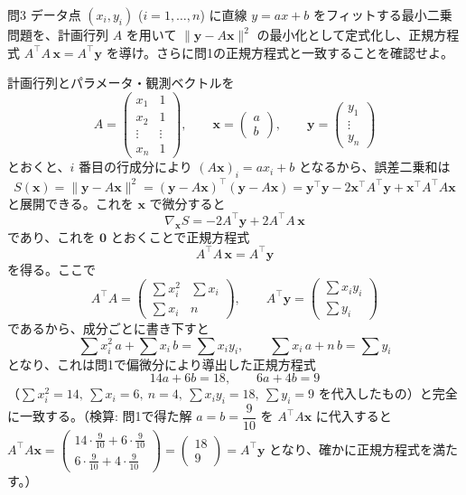 \documentclass[a4paper,11pt]{article}
\begin{document}
\clearpage
\begin{mondaiboxS}{問3}
データ点 $(x_i,y_i)$ ($i=1,\dots,n$) に直線 $y=ax+b$ をフィットする最小二乗問題を、計画行列 $A$ を用いて $\|\bm{y}-A\bm{x}\|^2$ の最小化として定式化し、正規方程式 $A^{\top}A\,\bm{x}=A^{\top}\bm{y}$ を導け。さらに問1の正規方程式と一致することを確認せよ。
\end{mondaiboxS}
\kaitou
計画行列とパラメータ・観測ベクトルを
\[
A = \begin{pmatrix} x_1 & 1 \\ x_2 & 1 \\ \vdots & \vdots \\ x_n & 1 \end{pmatrix}, \qquad
\bm{x} = \begin{pmatrix} a \\ b \end{pmatrix}, \qquad
\bm{y} = \begin{pmatrix} y_1 \\ \vdots \\ y_n \end{pmatrix}
\]
とおくと、$i$ 番目の行成分により $(A\bm{x})_i = ax_i + b$ となるから、誤差二乗和は
\[
S(\bm{x}) = \|\bm{y} - A\bm{x}\|^2 = (\bm{y}-A\bm{x})^{\top}(\bm{y}-A\bm{x})
= \bm{y}^{\top}\bm{y} - 2\bm{x}^{\top}A^{\top}\bm{y} + \bm{x}^{\top}A^{\top}A\bm{x}
\]
と展開できる。これを $\bm{x}$ で微分すると
\[
\nabla_{\bm{x}} S = -2A^{\top}\bm{y} + 2A^{\top}A\,\bm{x}
\]
であり、これを $\bm{0}$ とおくことで正規方程式
\[
\boxed{\; A^{\top}A\,\bm{x} = A^{\top}\bm{y} \;}
\]
を得る。ここで
\[
A^{\top}A = \begin{pmatrix} \sum x_i^2 & \sum x_i \\ \sum x_i & n \end{pmatrix}, \qquad
A^{\top}\bm{y} = \begin{pmatrix} \sum x_i y_i \\ \sum y_i \end{pmatrix}
\]
であるから、成分ごとに書き下すと
\[
\sum x_i^2\, a + \sum x_i\, b = \sum x_i y_i, \qquad \sum x_i\, a + n\, b = \sum y_i
\]
となり、これは問1で偏微分により導出した正規方程式
\[
14a+6b=18, \qquad 6a+4b=9
\]
（$\sum x_i^2=14,\ \sum x_i=6,\ n=4,\ \sum x_iy_i=18,\ \sum y_i=9$ を代入したもの）と完全に一致する。（検算: 問1で得た解 $a=b=\dfrac{9}{10}$ を $A^{\top}A\bm{x}$ に代入すると $A^{\top}A\bm{x} = \begin{pmatrix}14\cdot\frac{9}{10}+6\cdot\frac{9}{10}\\ 6\cdot\frac{9}{10}+4\cdot\frac{9}{10}\end{pmatrix} = \begin{pmatrix}18\\9\end{pmatrix} = A^{\top}\bm{y}$ となり、確かに正規方程式を満たす。）
\end{document}
